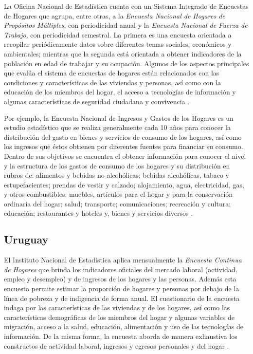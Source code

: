 \documentclass[
  12pt,
]{book}
\begin{document}
La Oficina Nacional de Estadística cuenta con un Sistema Integrado de Encuestas de Hogares que agrupa, entre otras, a la \emph{Encuesta Nacional de Hogares de Propósitos Múltiples}, con periodicidad anual y la \emph{Encuesta Nacional de Fuerza de Trabajo}, con periodicidad semestral. La primera es una encuesta orientada a recopilar periódicamente datos sobre diferentes temas sociales, económicos y ambientales; mientras que la segunda está orientada a obtener indicadores de la población en edad de trabajar y su ocupación. Algunos de los aspectos principales que evalúa el sistema de encuestas de hogares están relacionados con las condiciones y características de las viviendas y personas, así como con la educación de los miembros del hogar, el acceso a tecnologías de información y algunas características de seguridad ciudadana y convivencia \citep{ONE-DO}.

Por ejemplo, la Encuesta Nacional de Ingresos y Gastos de los Hogares es un estudio estadístico que se realiza generalmente cada 10 años para conocer la distribución del gasto en bienes y servicios de consumo de los hogares, así como los ingresos que éstos obtienen por diferentes fuentes para financiar su consumo. Dentro de sus objetivos se encuentra el obtener información para conocer el nivel y la estructura de los gastos de consumo de los hogares y su distribución en rubros de: alimentos y bebidas no alcohólicas; bebidas alcohólicas, tabaco y estupefacientes; prendas de vestir y calzado; alojamiento, agua, electricidad, gas, y otros combustibles; muebles, artículos para el hogar y para la conservación ordinaria del hogar; salud; transporte; comunicaciones; recreación y cultura; educación; restaurantes y hoteles y, bienes y servicios diversos \citep{ONE2-DO}.

\hypertarget{uruguay}{%
\subsection{Uruguay}\label{uruguay}}

El Instituto Nacional de Estadística aplica mensualmente la \emph{Encuesta Continua de Hogares} que brinda los indicadores oficiales del mercado laboral (actividad, empleo y desempleo) y de ingresos de los hogares y las personas. Además esta encuesta permite estimar la proporción de hogares y personas por debajo de la línea de pobreza y de indigencia de forma anual. El cuestionario de la encuesta indaga por las características de las viviendas y de los hogares, así como las características demográficas de los miembros del hogar y algunas variables de migración, acceso a la salud, educación, alimentación y uso de las tecnologías de información. De la misma forma, la encuesta aborda de manera exhaustiva los constructos de actividad laboral, ingresos y egresos personales y del hogar \citep{INE-UY_2016}.
\end{document}
